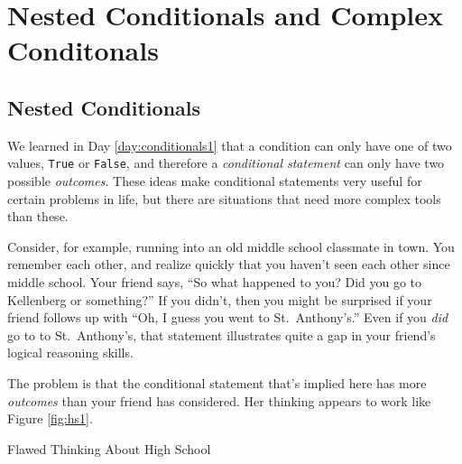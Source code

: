 
\setcounter{chapter}{6}
\chapter{Nested Conditionals and Complex Conditonals}


\minitoc

\section{Nested Conditionals}

We learned in Day \ref{day:conditionals1} that a condition can only have one of two values, \texttt{True} or \texttt{False}, and therefore a \textit{conditional statement} can only have two possible \textit{outcomes}.  These ideas make conditional statements very useful for certain problems in life, but there are situations that need more complex tools than these.

Consider, for example, running into an old middle school classmate in town.  You remember each other, and realize quickly that you haven't seen each other since middle school.  Your friend says, ``So what happened to you?  Did you go to Kellenberg or something?''  If you didn't, then you might be surprised if your friend follows up with ``Oh, I guess you went to St.\ Anthony's.''  Even if you \textit{did} go to to St.\ Anthony's, that statement illustrates quite a gap in your friend's logical reasoning skills.

The problem is that the conditional statement that's implied here has more \textit{outcomes} than your friend has considered.  Her thinking appears to work like Figure \ref{fig:hs1}.

\begin{myfigure}[label=fig:hs1]{Flawed Thinking About High School}
    \begin{minipage}{0.925\linewidth}
        \centering
    \end{minipage}
\end{myfigure}


